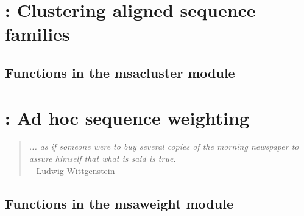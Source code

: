 \documentclass[10pt]{book}
\begin{document}
\newpage
\section{: Clustering aligned sequence families}

\subsection{Functions in the msacluster module}


\newpage
\section{: Ad hoc sequence weighting}
\begin{quote}
 \emph{... as if someone were to buy several copies of the morning
 newspaper to assure himself that what is said is true.}\\
\hspace*{1em}\hfill -- Ludwig Wittgenstein \citep[cited in]{Altschul89}
\end{quote}

\subsection{Functions in the msaweight module}



\end{document}
